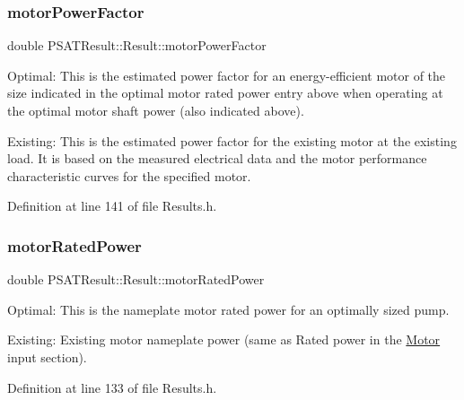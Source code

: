 \mbox{\label{struct_p_s_a_t_result_1_1_result_a19ac96991a81b7c4e69b5b37bf05c460}} 
\subsubsection{\texorpdfstring{motor\+Power\+Factor}{motorPowerFactor}}
{\footnotesize\ttfamily double P\+S\+A\+T\+Result\+::\+Result\+::motor\+Power\+Factor}



Optimal\+: This is the estimated power factor for an energy-\/efficient motor of the size indicated in the optimal motor rated power entry above when operating at the optimal motor shaft power (also indicated above). 

Existing\+: This is the estimated power factor for the existing motor at the existing load. It is based on the measured electrical data and the motor performance characteristic curves for the specified motor. 

Definition at line 141 of file Results.\+h.

\mbox{\label{struct_p_s_a_t_result_1_1_result_ae487ec5d7eed6f287f18b4ed15e1b639}} 
\subsubsection{\texorpdfstring{motor\+Rated\+Power}{motorRatedPower}}
{\footnotesize\ttfamily double P\+S\+A\+T\+Result\+::\+Result\+::motor\+Rated\+Power}



Optimal\+: This is the nameplate motor rated power for an optimally sized pump. 

Existing\+: Existing motor nameplate power (same as Rated power in the \hyperlink{struct_motor}{Motor} input section). 

Definition at line 133 of file Results.\+h.

\mbox{\label{struct_p_s_a_t_result_1_1_result_a75bfbaf59bbc736b53936069bcaf622a}} 
